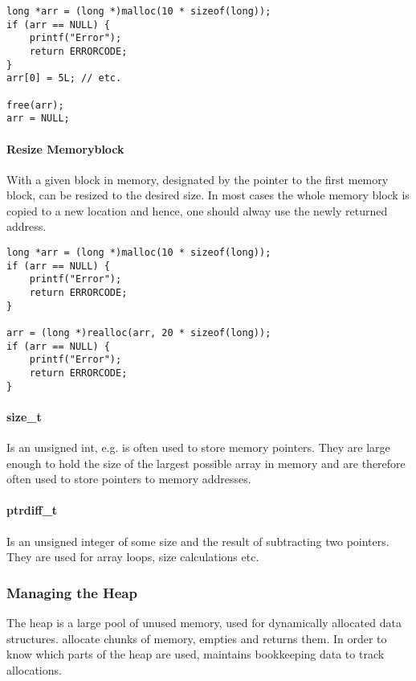 \begin{lstlisting}
long *arr = (long *)malloc(10 * sizeof(long));
if (arr == NULL) {
    printf("Error");
    return ERRORCODE;
}
arr[0] = 5L; // etc.

free(arr);
arr = NULL;
\end{lstlisting}

\paragraph{Resize Memoryblock}
With  a given block in memory, designated by the pointer to the first memory block, can be resized to the desired size. In most cases the whole memory block is copied to a new location and hence, one should alway use the newly returned address.

\begin{lstlisting}
long *arr = (long *)malloc(10 * sizeof(long));
if (arr == NULL) {
    printf("Error");
    return ERRORCODE;
}

arr = (long *)realloc(arr, 20 * sizeof(long));
if (arr == NULL) {
    printf("Error");
    return ERRORCODE;
}
\end{lstlisting}

\paragraph{size\_t}
Is an unsigned int, e.g.  is often used to store memory pointers. They are large enough to hold the size of the largest possible array in memory and are therefore often used to store pointers to memory addresses.

\paragraph{ptrdiff\_t}
Is an unsigned integer of some size and the result of subtracting two pointers. They are used for array loops, size calculations etc.

\subsubsection{Managing the Heap}
The heap is a large pool of unused memory, used for dynamically allocated data structures.  allocate chunks of memory,  empties and returns them. In order to know which parts of the heap are used,  maintains bookkeeping data to track allocations.

